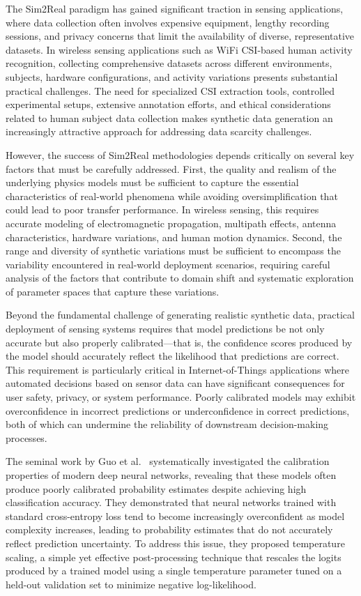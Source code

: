 \documentclass[journal]{IEEEtran}
\begin{document}
The Sim2Real paradigm has gained significant traction in sensing applications, where data collection often involves expensive equipment, lengthy recording sessions, and privacy concerns that limit the availability of diverse, representative datasets. In wireless sensing applications such as WiFi CSI-based human activity recognition, collecting comprehensive datasets across different environments, subjects, hardware configurations, and activity variations presents substantial practical challenges. The need for specialized CSI extraction tools, controlled experimental setups, extensive annotation efforts, and ethical considerations related to human subject data collection makes synthetic data generation an increasingly attractive approach for addressing data scarcity challenges.

However, the success of Sim2Real methodologies depends critically on several key factors that must be carefully addressed. First, the quality and realism of the underlying physics models must be sufficient to capture the essential characteristics of real-world phenomena while avoiding oversimplification that could lead to poor transfer performance. In wireless sensing, this requires accurate modeling of electromagnetic propagation, multipath effects, antenna characteristics, hardware variations, and human motion dynamics. Second, the range and diversity of synthetic variations must be sufficient to encompass the variability encountered in real-world deployment scenarios, requiring careful analysis of the factors that contribute to domain shift and systematic exploration of parameter spaces that capture these variations.

Beyond the fundamental challenge of generating realistic synthetic data, practical deployment of sensing systems requires that model predictions be not only accurate but also properly calibrated—that is, the confidence scores produced by the model should accurately reflect the likelihood that predictions are correct. This requirement is particularly critical in Internet-of-Things applications where automated decisions based on sensor data can have significant consequences for user safety, privacy, or system performance. Poorly calibrated models may exhibit overconfidence in incorrect predictions or underconfidence in correct predictions, both of which can undermine the reliability of downstream decision-making processes.

The seminal work by Guo et al.~\cite{calibration_guo2017} systematically investigated the calibration properties of modern deep neural networks, revealing that these models often produce poorly calibrated probability estimates despite achieving high classification accuracy. They demonstrated that neural networks trained with standard cross-entropy loss tend to become increasingly overconfident as model complexity increases, leading to probability estimates that do not accurately reflect prediction uncertainty. To address this issue, they proposed temperature scaling, a simple yet effective post-processing technique that rescales the logits produced by a trained model using a single temperature parameter tuned on a held-out validation set to minimize negative log-likelihood.
\end{document}
